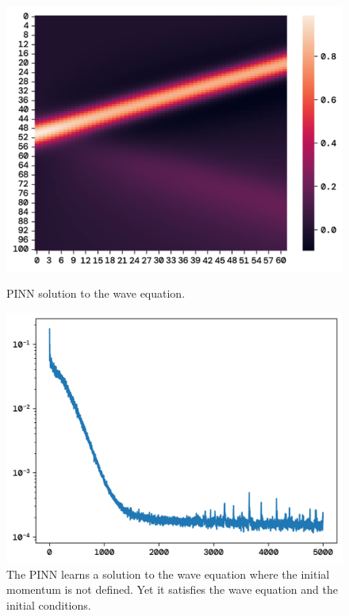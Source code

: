 \documentclass[twoside,11pt]{report}
\begin{document}
    \begin{figure}[!ht]
        \begin{minipage}[t]{0.5\textwidth - 1mm}
            \begin{center}
                \includegraphics[width=\textwidth]{../runsAndFigures/wave_tf_pinn.png}
            \end{center}
            \caption
            {
                PINN solution to the wave equation.
            }\label{fig:wave_own_dnn}
        \end{minipage}
        \hspace{2mm}
        \begin{minipage}[t]{0.5\textwidth - 1mm}
            \begin{center}
                \includegraphics[width=\textwidth]{../runsAndFigures/wave_tf_pinn_loss.png}
            \end{center}
            \caption
            {
                The PINN learns a solution to the wave equation where the initial momentum is not defined.
                Yet it satisfies the wave equation and the initial conditions.
            }\label{fig:wave_tf_dnn}
        \end{minipage}
    \end{figure}
\end{document}
